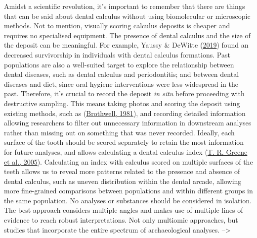 \documentclass[
  letterpaper,
]{book}
\begin{document}
Amidst a scientific revolution, it's important to remember that there
are things that can be said about dental calculus without using
biomolecular or microscopic methods. Not to mention, visually scoring
calculus deposits is cheaper and requires no specialised equipment. The
presence of dental calculus and the size of the deposit can be
meaningful. For example, Yaussy \& DeWitte
(\protect\hyperlink{ref-yaussyCalculusSurvivorship2019}{2019}) found an
decreased survivorship in individuals with dental calculus formations.
Past populations are also a well-suited target to explore the
relationship between dental diseases, such as dental calculus and
periodontitis; and between dental diseases and diet, since oral hygiene
interventions were less widespread in the past. Therefore, it's crucial
to record the deposit \emph{in situ} before proceeding with destructive
sampling. This means taking photos and scoring the deposit using
existing methods, such as
(\protect\hyperlink{ref-brothwellDiggingBones1981}{Brothwell, 1981}),
and recording detailed information allowing researchers to filter out
unnecessary information in downstream analyses rather than missing out
on something that was never recorded. Ideally, each surface of the tooth
should be scored separately to retain the most information for future
analyses, and allows calculating a dental calculus index
(\protect\hyperlink{ref-greeneQuantifyingCalculus2005}{T. R. Greene et
al., 2005}). Calculating an index with calculus scored on multiple
surfaces of the teeth allows us to reveal more patterns related to the
presence and absence of dental calculus, such as uneven distribution
within the dental arcade, allowing more fine-grained comparisons between
populations and within different groups in the same population. No
analyses or substances should be considered in isolation. The best
approach considers multiple angles and makes use of multiple lines of
evidence to reach robust interpretations. Not only multiomic approaches,
but studies that incorporate the entire spectrum of archaeological
analyses. --\textgreater{}
\end{document}
